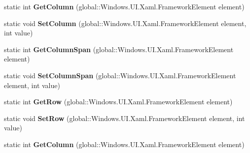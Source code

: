 \begin{DoxyCompactItemize}
\mbox{\label{class_windows_1_1_u_i_1_1_xaml_1_1_controls_1_1_grid_adeabc44596ae45474187e91cc83b4053}} 
static int {\bfseries Get\+Column} (global\+::\+Windows.\+U\+I.\+Xaml.\+Framework\+Element element)
\item 
\mbox{\label{class_windows_1_1_u_i_1_1_xaml_1_1_controls_1_1_grid_ad85395750dd3aafd10cf1aa7214b4051}} 
static void {\bfseries Set\+Column} (global\+::\+Windows.\+U\+I.\+Xaml.\+Framework\+Element element, int value)
\item 
\mbox{\label{class_windows_1_1_u_i_1_1_xaml_1_1_controls_1_1_grid_a166c94be72db2ad46f7ced5642ff2bb1}} 
static int {\bfseries Get\+Column\+Span} (global\+::\+Windows.\+U\+I.\+Xaml.\+Framework\+Element element)
\item 
\mbox{\label{class_windows_1_1_u_i_1_1_xaml_1_1_controls_1_1_grid_afb75a6ca2719689f16cf68ede010bdb2}} 
static void {\bfseries Set\+Column\+Span} (global\+::\+Windows.\+U\+I.\+Xaml.\+Framework\+Element element, int value)
\item 
\mbox{\label{class_windows_1_1_u_i_1_1_xaml_1_1_controls_1_1_grid_a0cf3a18d57c7a539b00d9d58910fc197}} 
static int {\bfseries Get\+Row} (global\+::\+Windows.\+U\+I.\+Xaml.\+Framework\+Element element)
\item 
\mbox{\label{class_windows_1_1_u_i_1_1_xaml_1_1_controls_1_1_grid_a2d87af7c083d5c02d5eb9d3079e6c84f}} 
static void {\bfseries Set\+Row} (global\+::\+Windows.\+U\+I.\+Xaml.\+Framework\+Element element, int value)
\item 
\mbox{\label{class_windows_1_1_u_i_1_1_xaml_1_1_controls_1_1_grid_adeabc44596ae45474187e91cc83b4053}} 
static int {\bfseries Get\+Column} (global\+::\+Windows.\+U\+I.\+Xaml.\+Framework\+Element element)
\item 
\mbox{\label{class_windows_1_1_u_i_1_1_xaml_1_1_controls_1_1_grid_ad85395750dd3aafd10cf1aa7214b4051}} 

\end{DoxyCompactItemize}
